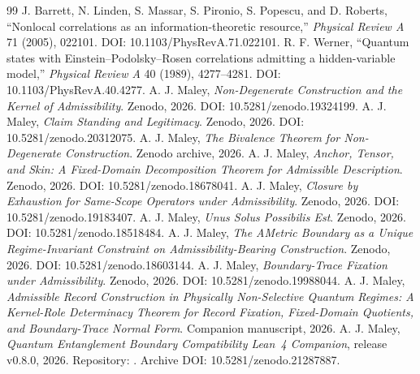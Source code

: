 \documentclass[11pt]{article}
\theoremstyle{definition}
\begin{document}
\begin{thebibliography}{99}
 J. Barrett, N. Linden, S. Massar, S. Pironio, S. Popescu, and D. Roberts, ``Nonlocal correlations as an information-theoretic resource,'' \emph{Physical Review A} 71 (2005), 022101. DOI: 10.1103/PhysRevA.71.022101.
 R. F. Werner, ``Quantum states with Einstein--Podolsky--Rosen correlations admitting a hidden-variable model,'' \emph{Physical Review A} 40 (1989), 4277--4281. DOI: 10.1103/PhysRevA.40.4277.
 A. J. Maley, \emph{Non-Degenerate Construction and the Kernel of Admissibility}. Zenodo, 2026. DOI: 10.5281/zenodo.19324199.
 A. J. Maley, \emph{Claim Standing and Legitimacy}. Zenodo, 2026. DOI: 10.5281/zenodo.20312075.
 A. J. Maley, \emph{The Bivalence Theorem for Non-Degenerate Construction}. Zenodo archive, 2026.
 A. J. Maley, \emph{Anchor, Tensor, and Skin: A Fixed-Domain Decomposition Theorem for Admissible Description}. Zenodo, 2026. DOI: 10.5281/zenodo.18678041.
 A. J. Maley, \emph{Closure by Exhaustion for Same-Scope Operators under Admissibility}. Zenodo, 2026. DOI: 10.5281/zenodo.19183407.
 A. J. Maley, \emph{Unus Solus Possibilis Est}. Zenodo, 2026. DOI: 10.5281/zenodo.18518484.
 A. J. Maley, \emph{The AMetric Boundary as a Unique Regime-Invariant Constraint on Admissibility-Bearing Construction}. Zenodo, 2026. DOI: 10.5281/zenodo.18603144.
 A. J. Maley, \emph{Boundary-Trace Fixation under Admissibility}. Zenodo, 2026. DOI: 10.5281/zenodo.19988044.
 A. J. Maley, \emph{Admissible Record Construction in Physically Non-Selective Quantum Regimes: A Kernel-Role Determinacy Theorem for Record Fixation, Fixed-Domain Quotients, and Boundary-Trace Normal Form}. Companion manuscript, 2026.
 A. J. Maley, \emph{Quantum Entanglement Boundary Compatibility Lean~4 Companion}, release v0.8.0, 2026. Repository: . Archive DOI: 10.5281/zenodo.21287887.
\end{thebibliography}
\end{document}
